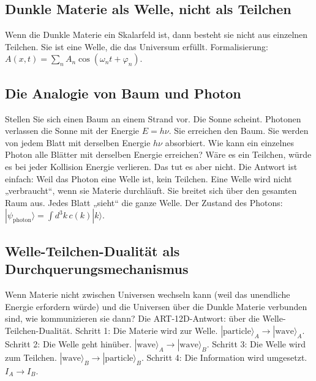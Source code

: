 \documentclass[11pt,a4paper]{article}
\begin{document}
\subsection{Dunkle Materie als Welle, nicht als Teilchen}
Wenn die Dunkle Materie ein Skalarfeld ist, dann besteht sie nicht aus einzelnen Teilchen. Sie ist eine Welle, die das Universum erfüllt. Formalisierung: $A(x,t) = \sum_n A_n \cos(\omega_n t + \varphi_n)$.

\subsection{Die Analogie von Baum und Photon}
Stellen Sie sich einen Baum an einem Strand vor. Die Sonne scheint. Photonen verlassen die Sonne mit der Energie $E = h\nu$. Sie erreichen den Baum. Sie werden von jedem Blatt mit derselben Energie $h\nu$ absorbiert. Wie kann ein einzelnes Photon alle Blätter mit derselben Energie erreichen? Wäre es ein Teilchen, würde es bei jeder Kollision Energie verlieren. Das tut es aber nicht. Die Antwort ist einfach: Weil das Photon eine Welle ist, kein Teilchen. Eine Welle wird nicht „verbraucht``, wenn sie Materie durchläuft. Sie breitet sich über den gesamten Raum aus. Jedes Blatt „sieht`` die ganze Welle. Der Zustand des Photons: $|\psi_{\text{photon}}\rangle = \int d^3k \, c(k) |k\rangle$.

\subsection{Welle-Teilchen-Dualität als Durchquerungsmechanismus}
Wenn Materie nicht zwischen Universen wechseln kann (weil das unendliche Energie erfordern würde) und die Universen über die Dunkle Materie verbunden sind, wie kommunizieren sie dann? Die ART-12D-Antwort: über die Welle-Teilchen-Dualität. Schritt 1: Die Materie wird zur Welle. $|\text{particle}\rangle_A \to |\text{wave}\rangle_A$. Schritt 2: Die Welle geht hinüber. $|\text{wave}\rangle_A \to |\text{wave}\rangle_B$. Schritt 3: Die Welle wird zum Teilchen. $|\text{wave}\rangle_B \to |\text{particle}\rangle_B$. Schritt 4: Die Information wird umgesetzt. $I_A \to I_B$.
\end{document}
